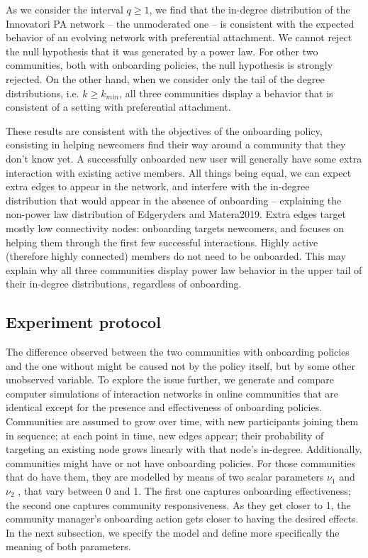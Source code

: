 \documentclass{bmcart}
\begin{document}
As we consider the interval  $q \geq 1$, we find that the in-degree distribution of the Innovatori PA network -- the unmoderated one -- is consistent with the expected behavior of an evolving network with preferential attachment. We cannot reject the null hypothesis that it was generated by a power law. For other two communities, both with onboarding policies, the null hypothesis is strongly rejected. On the other hand, when we consider only the tail of the degree distributions, i.e. $k \geq k_{min}$, all three communities display a behavior that is consistent of a setting with preferential attachment.

These results are consistent with the objectives of the onboarding policy, consisting in helping newcomers find their way around a community that they don't know yet. A successfully onboarded new user will generally have some extra interaction with existing active members. All things being equal, we can expect extra edges to appear in the network, and interfere with the in-degree distribution that would appear in the absence of onboarding -- explaining the non-power law distribution of Edgeryders and Matera2019. Extra edges target mostly low connectivity nodes: onboarding targets newcomers, and focuses on helping them through the first few successful interactions. Highly active (therefore highly connected) members do not need to be onboarded. This may explain why all three communities display power law behavior in the upper tail of their in-degree distributions, regardless of onboarding. 

\subsection*{Experiment protocol}
\label{ss:experiment_protocol}
The difference observed between the two communities with onboarding policies and the one without might be caused not by the policy itself, but by some other unobserved variable. To explore the issue further, we generate and compare computer simulations of interaction networks in online communities that are identical except for the presence and effectiveness of onboarding policies. Communities are assumed to grow over time, with new participants joining them in sequence; at each point in time, new edges appear; their probability of targeting an existing node grows linearly with that node's in-degree. Additionally, communities might have or not have onboarding policies. For those communities that do have them, they are modelled by means of two scalar parameters $\nu_1$  and $\nu_2$ , that vary between 0 and 1. The first one captures onboarding effectiveness;  the second one captures community responsiveness. As they get closer to 1, the community manager's onboarding action gets closer to having the desired effects. In the next subsection, we specify the model and define more specifically the meaning of both parameters.
\end{document}
